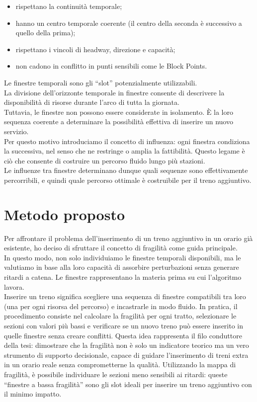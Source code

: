 \documentclass[a4paper,12pt]{report}
\begin{document}
\begin{itemize}
    \item rispettano la continuità temporale;


    \item hanno un centro temporale coerente (il centro della seconda è successivo a quello della prima);

    \item rispettano i vincoli di headway, direzione e capacità;

     \item non cadono in conflitto in punti sensibili come le Block Points.

  \end{itemize}
Le finestre temporali sono gli “slot” potenzialmente utilizzabili. \\ La divisione dell’orizzonte temporale in finestre consente di descrivere la disponibilità di risorse durante l'arco di tutta la giornata. \\ 
Tuttavia, le finestre non possono essere considerate in isolamento. È la loro sequenza coerente a determinare la possibilità effettiva di inserire un nuovo servizio. \\ Per questo motivo introduciamo il concetto di influenza: ogni finestra condiziona la successiva, nel senso che ne restringe o amplia la fattibilità. Questo legame è ciò che consente di costruire un percorso fluido lungo più stazioni. \\ Le influenze tra finestre determinano dunque quali sequenze sono effettivamente percorribili, e quindi quale percorso ottimale è costruibile per il treno aggiuntivo.


\section{Metodo proposto}
Per affrontare il problema dell’inserimento di un treno aggiuntivo in un orario già esistente, ho deciso di sfruttare il concetto di fragilità come guida principale. \\ In questo modo, non solo individuiamo le finestre temporali disponibili, ma le valutiamo in base alla loro capacità di assorbire perturbazioni senza generare ritardi a catena.
Le finestre rappresentano la materia prima su cui l’algoritmo lavora. \\ Inserire un treno significa scegliere una sequenza di finestre compatibili tra loro (una per ogni risorsa del percorso) e incastrarle in modo fluido.
In pratica, il procedimento consiste nel calcolare la fragilità per ogni tratto, selezionare le sezioni con valori più bassi e verificare se un nuovo treno può essere inserito in quelle finestre senza creare conflitti. Questa idea rappresenta il filo conduttore della tesi: dimostrare che la fragilità non è solo un indicatore teorico ma un vero strumento di supporto decisionale, capace di guidare l’inserimento di treni extra in un orario reale senza comprometterne la qualità.
 Utilizzando la mappa di fragilità, è possibile individuare le sezioni meno sensibili ai ritardi: queste “finestre a bassa fragilità” sono gli slot ideali per inserire un treno aggiuntivo con il minimo impatto. 
\end{document}
